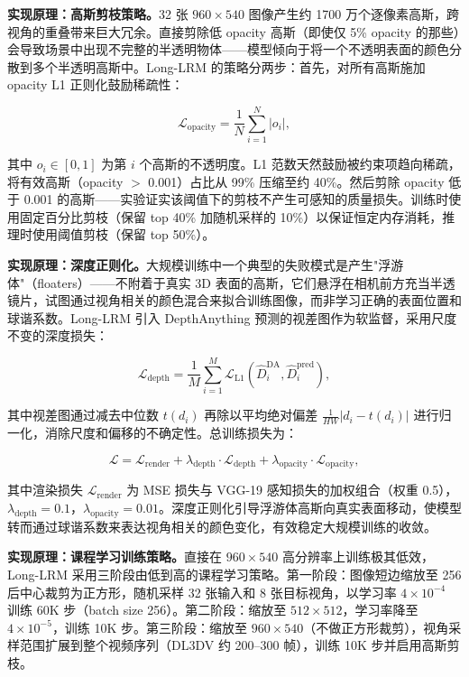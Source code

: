 \textbf{实现原理：高斯剪枝策略。}32 张 $960\times540$ 图像产生约 1700 万个逐像素高斯，跨视角的重叠带来巨大冗余。直接剪除低 opacity 高斯（即使仅 5\% opacity 的那些）会导致场景中出现不完整的半透明物体——模型倾向于将一个不透明表面的颜色分散到多个半透明高斯中。Long-LRM 的策略分两步：首先，对所有高斯施加 opacity L1 正则化鼓励稀疏性：

\begin{equation}
\mathcal{L}_{\mathrm{opacity}} = \frac{1}{N} \sum_{i=1}^{N} |o_i|,
\end{equation}

其中 $o_i \in [0, 1]$ 为第 $i$ 个高斯的不透明度。L1 范数天然鼓励被约束项趋向稀疏，将有效高斯（opacity $>$ 0.001）占比从 99\% 压缩至约 40\%。然后剪除 opacity 低于 0.001 的高斯——实验证实该阈值下的剪枝不产生可感知的质量损失。训练时使用固定百分比剪枝（保留 top 40\% 加随机采样的 10\%）以保证恒定内存消耗，推理时使用阈值剪枝（保留 top 50\%）。

\textbf{实现原理：深度正则化。}大规模训练中一个典型的失败模式是产生"浮游体"（floaters）——不附着于真实 3D 表面的高斯，它们悬浮在相机前方充当半透镜片，试图通过视角相关的颜色混合来拟合训练图像，而非学习正确的表面位置和球谐系数。Long-LRM 引入 DepthAnything 预测的视差图作为软监督，采用尺度不变的深度损失：

\begin{equation}
\mathcal{L}_{\mathrm{depth}} = \frac{1}{M} \sum_{i=1}^{M} \mathcal{L}_{\mathrm{L1}}(\hat{D}^{\mathrm{DA}}_i, \hat{D}^{\mathrm{pred}}_i),
\end{equation}

其中视差图通过减去中位数 $t(d_i)$ 再除以平均绝对偏差 $\frac{1}{HW}|d_i - t(d_i)|$ 进行归一化，消除尺度和偏移的不确定性。总训练损失为：

\begin{equation}
\mathcal{L} = \mathcal{L}_{\mathrm{render}} + \lambda_{\mathrm{depth}} \cdot \mathcal{L}_{\mathrm{depth}} + \lambda_{\mathrm{opacity}} \cdot \mathcal{L}_{\mathrm{opacity}},
\end{equation}

其中渲染损失 $\mathcal{L}_{\mathrm{render}}$ 为 MSE 损失与 VGG-19 感知损失的加权组合（权重 0.5），$\lambda_{\mathrm{depth}}=0.1$，$\lambda_{\mathrm{opacity}}=0.01$。深度正则化引导浮游体高斯向真实表面移动，使模型转而通过球谐系数来表达视角相关的颜色变化，有效稳定大规模训练的收敛。

\textbf{实现原理：课程学习训练策略。}直接在 $960\times540$ 高分辨率上训练极其低效，Long-LRM 采用三阶段由低到高的课程学习策略。第一阶段：图像短边缩放至 256 后中心裁剪为正方形，随机采样 32 张输入和 8 张目标视角，以学习率 $4\times10^{-4}$ 训练 60K 步（batch size 256）。第二阶段：缩放至 $512\times512$，学习率降至 $4\times10^{-5}$，训练 10K 步。第三阶段：缩放至 $960\times540$（不做正方形裁剪），视角采样范围扩展到整个视频序列（DL3DV 约 200--300 帧），训练 10K 步并启用高斯剪枝。

